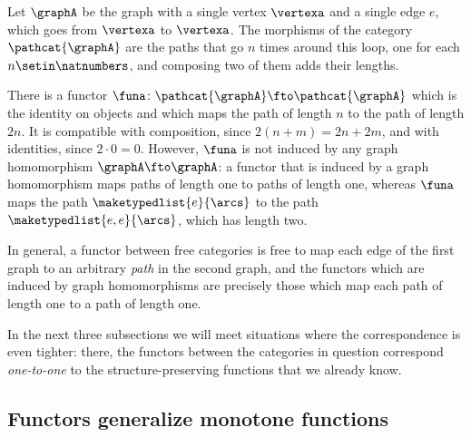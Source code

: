 \begin{example}
    \label{exa:functor-not-from-graph-hom}
    Let $\graphA$ be the graph with a single vertex $\vertexa$ and a single edge $e$, which goes from $\vertexa$ to $\vertexa$.
    The morphisms of the category $\pathcat{\graphA}$ are the paths that go $n$ times around this loop, one for each $n \setin \natnumbers$, and composing two of them adds their lengths.

    There is a functor $\funa \colon \pathcat{\graphA} \fto \pathcat{\graphA}$ which is the identity on objects and which maps the path of length $n$ to the path of length $2n$.
    It is compatible with composition, since $2(n + m) = 2n + 2m$, and with identities, since $2 \cdot 0 = 0$.
    However, $\funa$ is not induced by any graph homomorphism $\graphA \fto \graphA$: a functor that is induced by a graph homomorphism maps paths of length one to paths of length one, whereas $\funa$ maps the path $\maketypedlist{e}{\arcs}$ to the path $\maketypedlist{e, e}{\arcs}$, which has length two.
\end{example}

In general, a functor between free categories is free to map each edge of the first graph to an arbitrary \emph{path} in the second graph, and the functors which are induced by graph homomorphisms are precisely those which map each path of length one to a path of length one.

In the next three subsections we will meet situations where the correspondence is even tighter: there, the functors between the categories in question correspond \emph{one-to-one} to the structure-preserving functions that we already know.


\subsection{Functors generalize monotone functions}
\label{sec:posetsarecats}


